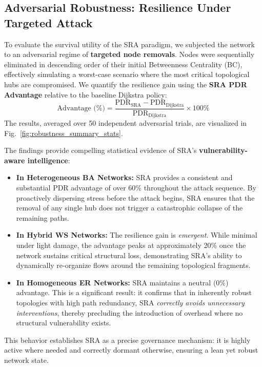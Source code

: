\documentclass[journal]{IEEEtran}
\theoremstyle{plain}
\theoremstyle{definition}
\begin{document}
\subsection{Adversarial Robustness: Resilience Under Targeted Attack}
\label{subsec:robustness_and_params}

To evaluate the survival utility of the SRA paradigm, we subjected the network to an adversarial regime of \textbf{targeted node removals}. 
Nodes were sequentially eliminated in descending order of their initial Betweenness Centrality (BC), effectively simulating a worst-case scenario where the most critical topological hubs are compromised. 
We quantify the resilience gain using the \textbf{SRA PDR Advantage} relative to the baseline Dijkstra policy:
\begin{equation}
\label{eq:pdr_advantage}
\text{Advantage (\%)} = \frac{\text{PDR}_{\text{SRA}} - \text{PDR}_{\text{Dijkstra}}}{\text{PDR}_{\text{Dijkstra}}} \times 100\%
\end{equation}
The results, averaged over 50 independent adversarial trials, are visualized in Fig.~\ref{fig:robustness_summary_stats}. 

The findings provide compelling statistical evidence of SRA's \textbf{vulnerability-aware intelligence}:
\begin{itemize}
    \item \textbf{In Heterogeneous BA Networks:} SRA provides a consistent and substantial PDR advantage of over 60\% throughout the attack sequence. By proactively dispersing stress before the attack begins, SRA ensures that the removal of any single hub does not trigger a catastrophic collapse of the remaining paths.
    \item \textbf{In Hybrid WS Networks:} The resilience gain is \textit{emergent}. While minimal under light damage, the advantage peaks at approximately 20\% once the network sustains critical structural loss, demonstrating SRA's ability to dynamically re-organize flows around the remaining topological fragments.
    \item \textbf{In Homogeneous ER Networks:} SRA maintains a neutral (0\%) advantage. This is a significant result: it confirms that in inherently robust topologies with high path redundancy, SRA \textit{correctly avoids unnecessary interventions}, thereby precluding the introduction of overhead where no structural vulnerability exists.
\end{itemize}

This behavior establishes SRA as a precise governance mechanism: it is highly active where needed and correctly dormant otherwise, ensuring a lean yet robust network state.
\end{document}
